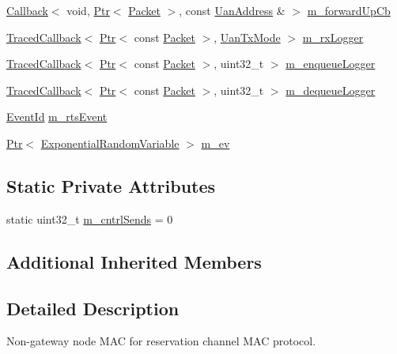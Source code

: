 \begin{DoxyCompactItemize}
\item 
\hyperlink{classns3_1_1Callback}{Callback}$<$ void, \hyperlink{classns3_1_1Ptr}{Ptr}$<$ \hyperlink{classns3_1_1Packet}{Packet} $>$, const \hyperlink{classns3_1_1UanAddress}{Uan\+Address} \& $>$ \hyperlink{classns3_1_1UanMacRc_a5e7c5946407caf5fc03bc328118005c9}{m\+\_\+forward\+Up\+Cb}
\item 
\hyperlink{classns3_1_1TracedCallback}{Traced\+Callback}$<$ \hyperlink{classns3_1_1Ptr}{Ptr}$<$ const \hyperlink{classns3_1_1Packet}{Packet} $>$, \hyperlink{classns3_1_1UanTxMode}{Uan\+Tx\+Mode} $>$ \hyperlink{classns3_1_1UanMacRc_ac1ad814ae22d6cea426cc5ca46089856}{m\+\_\+rx\+Logger}
\item 
\hyperlink{classns3_1_1TracedCallback}{Traced\+Callback}$<$ \hyperlink{classns3_1_1Ptr}{Ptr}$<$ const \hyperlink{classns3_1_1Packet}{Packet} $>$, uint32\+\_\+t $>$ \hyperlink{classns3_1_1UanMacRc_ad69b59d9a710aee726e01ab4ce7778a5}{m\+\_\+enqueue\+Logger}
\item 
\hyperlink{classns3_1_1TracedCallback}{Traced\+Callback}$<$ \hyperlink{classns3_1_1Ptr}{Ptr}$<$ const \hyperlink{classns3_1_1Packet}{Packet} $>$, uint32\+\_\+t $>$ \hyperlink{classns3_1_1UanMacRc_aa9a4d91db1d08882406cbfcabe72ccdf}{m\+\_\+dequeue\+Logger}
\item 
\hyperlink{classns3_1_1EventId}{Event\+Id} \hyperlink{classns3_1_1UanMacRc_a3e6d714bfb2a91d1f7c117e55e128487}{m\+\_\+rts\+Event}
\item 
\hyperlink{classns3_1_1Ptr}{Ptr}$<$ \hyperlink{classns3_1_1ExponentialRandomVariable}{Exponential\+Random\+Variable} $>$ \hyperlink{classns3_1_1UanMacRc_a46cd1ac54e4a0aa4278ee162e9fdb0d5}{m\+\_\+ev}
\end{DoxyCompactItemize}
\subsection*{Static Private Attributes}
\begin{DoxyCompactItemize}
\item 
static uint32\+\_\+t \hyperlink{classns3_1_1UanMacRc_a839e4af07d2bcffe634f6adb0e3e94ca}{m\+\_\+cntrl\+Sends} = 0
\end{DoxyCompactItemize}
\subsection*{Additional Inherited Members}


\subsection{Detailed Description}
Non-\/gateway node M\+AC for reservation channel M\+AC protocol.

